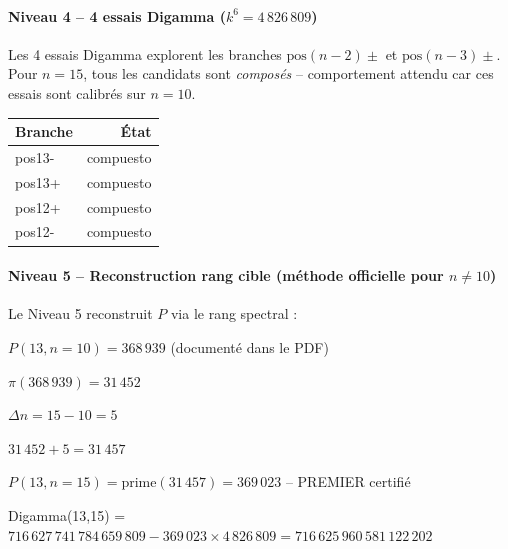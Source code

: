 \vspace{0.3cm}

\paragraph{Niveau 4 -- 4 essais Digamma ($k^{6} = 4\,826\,809$)}

Les 4 essais Digamma explorent les branches $\text{pos}(n-2)\pm$ et $\text{pos}(n-3)\pm$. Pour $n=15$, tous les candidats sont \emph{composés} -- comportement attendu car ces essais sont calibrés sur $n=10$.

\begin{center}
\begin{tabular}{@{}lr@{}}
\toprule
\rowcolor{spectralgris}
\textbf{Branche} & \textbf{État} \\
\midrule
pos13- & compuesto \\
pos13+ & compuesto \\
pos12+ & compuesto \\
pos12- & compuesto \\
\bottomrule
\end{tabular}
\end{center}

\vspace{0.3cm}

\paragraph{Niveau 5 -- Reconstruction rang cible (méthode officielle pour $n \neq 10$)}

Le Niveau 5 reconstruit $P$ via le rang spectral :

\begin{boitealgo}[Reconstruction rangf -- k=13]
\begin{description}[nosep]
  \item[Ancrage] $P(13, n=10) = 368\,939$ (documenté dans le PDF)
  \item[Rang de base] $\pi(368\,939) = 31\,452$
  \item[Écart] $\Delta n = 15 - 10 = 5$
  \item[Rang cible] $31\,452 + 5 = 31\,457$
  \item[Résultat] $P(13, n=15) = \text{prime}(31\,457) = 369\,023$ -- \textcolor{vert}{PREMIER certifié}
\end{description}
\end{boitealgo}

Digamma(13,15) = $716\,627\,741\,784\,659\,809 - 369\,023 \times 4\,826\,809 = 716\,625\,960\,581\,122\,202$

